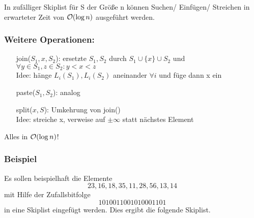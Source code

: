             \begin{satz}
        	        In zufälliger Skiplist für S der Größe n können Suchen/ Einfügen/ Streichen in erwarteter Zeit von $\mathcal{O}(\log n)$ ausgeführt werden.
            \end{satz}
        
        \subsubsection{Weitere Operationen:}
        	    \begin{itemize}
        	  	    \item[join($S_1,x,S_2$):] ersetzte $S_1,S_2$ durch $S_1\cup\{x\}\cup S_2$ und $\forall y\in S_1, z\in S_2 : y<x<z$\\
        	      		Idee: hänge $L_i(S_1),L_i(S_2)$ aneinander $\forall i$ und füge dann x ein
        	      	\item[paste($S_1,S_2$):] analog
        	      	\item[split($x,S$):] Umkehrung von join()\\
        	      		Idee: streiche x, verweise auf $\pm\infty$ statt nächstes Element
        	    \end{itemize}

		    Alles in $\mathcal{O}(\log n)$!
		    
		\subsubsection{Beispiel}
		    Es sollen beispielhaft die Elemente
            $$
                23, 16, 18, 35, 11, 28, 56, 13, 14
            $$
            mit Hilfe der Zufallsbitfolge
            $$
                1010011001010001101    
            $$
            in eine Skiplist eingefügt werden. Dies ergibt die folgende Skiplist.
            \begin{center}
                
            \end{center}